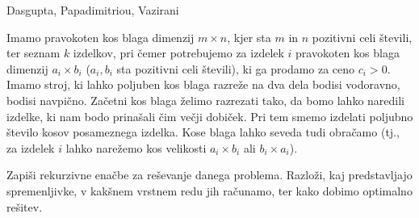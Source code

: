 \begin{naloga}%
{Dasgupta, Papadimitriou, Vazirani}{\cite[Exercise~6.14]{dpv}}
\begin{vprasanje}
Imamo pravokoten kos blaga dimenzij $m \times n$,
kjer sta $m$ in $n$ pozitivni celi števili,
ter seznam $k$ izdelkov,
pri čemer potrebujemo za izdelek $i$
pravokoten kos blaga dimenzij $a_i \times b_i$
($a_i, b_i$ sta pozitivni celi števili),
ki ga prodamo za ceno $c_i > 0$.
Imamo stroj, ki lahko poljuben kos blaga razreže na dva dela
bodisi vodoravno, bodisi navpično.
Začetni kos blaga želimo razrezati tako,
da bomo lahko naredili izdelke,
ki nam bodo prinašali čim večji dobiček.
Pri tem smemo izdelati poljubno število kosov posameznega izdelka.
Kose blaga lahko seveda tudi obračamo
(tj., za izdelek $i$ lahko narežemo kos velikosti
$a_i \times b_i$ ali $b_i \times a_i$).

Zapiši rekurzivne enačbe za reševanje danega problema.
Razloži, kaj predstavljajo spremenljivke,
v kakšnem vrstnem redu jih računamo,
ter kako dobimo optimalno rešitev.
\end{vprasanje}
\begin{odgovor}
\end{odgovor}
\end{naloga}
